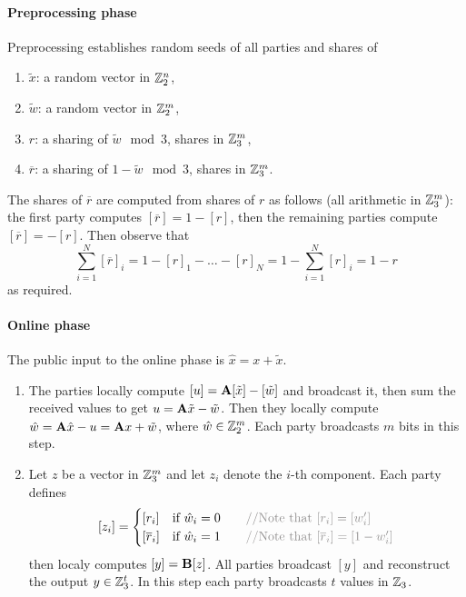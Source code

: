 \paragraph{Preprocessing phase} Preprocessing establishes random seeds of all parties and shares of 
\begin{enumerate}
\item $\tilde{x}$: a random vector in $\mathbb{Z}_2^{n}$,
\item $\tilde{w}$: a random vector in $\mathbb{Z}_2^{m}$, 
\item $r$: a sharing of $\tilde{w} \mod 3$, shares in $\mathbb{Z}_3^m$,  
\item $\overline{r}$: a sharing of $1-\tilde{w} \mod 3$, shares in $\mathbb{Z}_3^m$. 
\end{enumerate}
The shares of $\overline{r}$ are computed from shares of $r$ as follows (all arithmetic in $\mathbb{Z}_3^m$): the first
party computes $[\overline{r}] = 1 - [r]$, then the remaining parties compute
$[\overline{r}] = -[r]$.  Then observe that 
\[\sum_{i=1}^N [\overline{r}]_i = 1-[r]_1 - \ldots - [r]_N = 1 - \sum_{i=1}^{N}[r]_i = 1-r \]
 as required. 

\paragraph{Online phase}
The public input to the online phase is $\hat{x} = x + \tilde{x}$. 
\begin{enumerate}

\item The parties locally compute $[u] = \mathbf{A}[\tilde{x}] - [\tilde{w}]$ and broadcast it, 
then sum the received values to get $u = \mathbf{A} \tilde{x} - \tilde{w}$.  Then they locally compute
$\hat{w} = \mathbf{A}\hat{x} - u = \mathbf{A} x + \tilde{w}$, where $\hat{w} \in \mathbb{Z}_2^{m}$. Each party broadcasts $m$ bits in this step. 

\item Let $z$ be a vector in $\mathbb{Z}_3^m$ and let $z_i$ denote the $i$-th component. Each party defines 
\[
    [z_i]  = \begin{cases}
                [r_i]  & \text{if $\hat{w}_i = 0$} \algcomment{\text{Note that $[r_i] = [w_i']$}}\\
                [\overline{r}_i]  & \text{if $\hat{w}_i = 1$} \algcomment{\text{Note that $[\overline{r}_i] = [1- w_i']$}}\\
            \end{cases}
\]
then localy computes $[y] = \mathbf{B}[z]$. All parties broadcast $[y]$ and reconstruct the output $y\in\mathbb{Z}_{3}^t$. 
In this step each party broadcasts $t$ values in $\mathbb{Z}_3$.
\end{enumerate}

